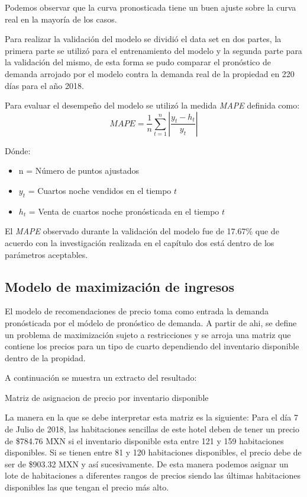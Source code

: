 Podemos observar que la curva pronosticada tiene un buen ajuste sobre la curva real en la mayoría de los casos.

Para realizar la validación del modelo se dividió el data set en dos partes, la primera parte se utilizó para el entrenamiento del modelo y la segunda parte para la validación del mismo, de esta forma se pudo comparar el pronóstico de demanda arrojado por el modelo contra la demanda real de la propiedad en 220 días para el año 2018.

Para evaluar el desempeño del modelo se utilizó la medida \emph{MAPE} definida como: $$MAPE=\frac{1}{n}\sum_{t=1}^{n}|\frac{y_t-h_t}{y_t}|$$

Dónde:
\begin{itemize}[noitemsep]
  \item n = Número de puntos ajustados
  \item $y_t$ = Cuartos noche vendidos en el tiempo $t$
  \item $h_t$ = Venta de cuartos noche pronósticada en el tiempo $t$
\end{itemize}


El \emph{MAPE} observado durante la validación del modelo fue de 17.67\% que de acuerdo con la investigación realizada en el capítulo dos está dentro de los parámetros aceptables.


\subsection*{Modelo de maximización de ingresos}

El modelo de recomendaciones de precio toma como entrada la demanda pronósticada por el módelo de pronóstico de demanda. A partir de ahi, se define un problema de maximización sujeto a restricciones y se arroja una matriz que contiene los precios para un tipo de cuarto dependiendo del inventario disponible dentro de la propidad.

A continuación se muestra un extracto del resultado:

\begin{table}[H]
  \centering
  \par
  \caption{Matriz de asignacion de precio por inventario disponible}
\end{table}

La manera en la que se debe interpretar esta matriz es la siguiente: Para el día 7 de Julio de 2018, las habitaciones sencillas de este hotel deben de tener un precio de \$784.76 MXN si el inventario disponible esta entre 121 y 159 habitaciones disponibles. Si se tienen entre 81 y 120 habitaciones disponibles, el precio debe de ser de \$903.32 MXN y así sucesivamente. De esta manera podemos asignar un lote de habitaciones a diferentes rangos de precios siendo las últimas habitaciones disponibles las que tengan el precio más alto.


